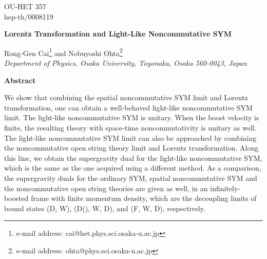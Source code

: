 \documentclass[a4paper,12pt]{article}
\begin{document}
\topmargin 0pt
\oddsidemargin 0mm

\renewcommand{\thefootnote}{\fnsymbol{footnote}}
\begin{titlepage}
\begin{flushright}
OU-HET 357 \\
hep-th/0008119
\end{flushright}

\vspace{5mm}
\begin{center}
{\Large \bf Lorentz Transformation and Light-Like Noncommutative SYM}
\vspace{10mm}

{\large
Rong-Gen Cai\footnote{e-mail address: cai@het.phys.sci.osaka-u.ac.jp} and
Nobuyoshi Ohta\footnote{e-mail address: ohta@phys.sci.osaka-u.ac.jp}} \\
\vspace{8mm}
{\em Department of Physics, Osaka University,
Toyonaka, Osaka 560-0043, Japan}

\end{center}
\vspace{5mm}
\centerline{{\bf{Abstract}}}
\vspace{5mm}

We show that combining the spatial noncommutative SYM limit and Lorentz
transformation, one can obtain a well-behaved light-like noncommutative
SYM limit. The light-like noncommutative SYM is unitary. When the boost
velocity is finite, the resulting theory with space-time noncommutativity is
unitary as well. The light-like noncommutative SYM limit can also be approached
by combining the noncommutative open string theory limit and Lorentz
transformation. Along this line, we obtain the supergravity dual for the
light-like noncommutative SYM, which is the same as the one acquired using
a different method. As a comparison, the supergravity duals for the ordinary
SYM, spatial noncommutative SYM and the noncommutative open string theories
are given as well, in an infinitely-boosted frame with finite momentum density,
which are the decoupling limits of bound states (D\coordHE{}, W), (D(\coordHE{}), W, D\coordHE{}),
and (F\coordHE{}, W, D\coordHE{}), respectively.


\end{titlepage}

\newpage
\renewcommand{\thefootnote}{\arabic{footnote}}
\setcounter{footnote}{0}
\setcounter{page}{2}
\end{document}
